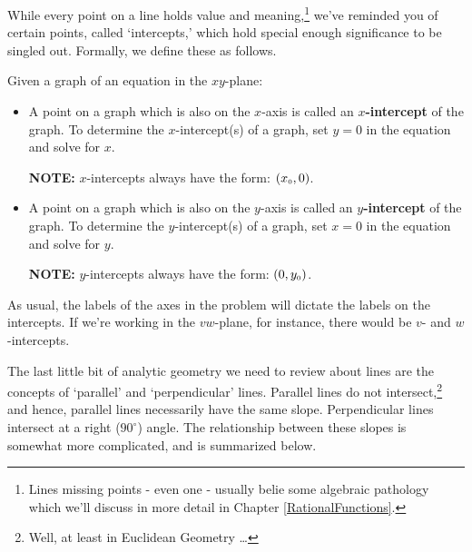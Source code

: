 While every point on a line holds value and meaning,\footnote{Lines missing points  - even one - usually belie some algebraic pathology which we'll discuss in more detail in Chapter \ref{RationalFunctions}.} we've reminded you of certain points, called `intercepts,' which hold special enough significance to be singled out. Formally, we define these as follows.

\medskip

\colorbox{ResultColor}{\bbm


\begin{defn}  Given a graph of an equation in the $xy$-plane:

\label{interceptsdefn}

\begin{itemize}

\item  A point on a graph which is also on the $x$-axis is called an  \textbf{\boldmath $x$-intercept} of the graph.  To determine the $x$-intercept(s) of a graph, set $y = 0$ in the equation and solve for $x$.

\textbf{NOTE:}  $x$-intercepts always have the form:  $(x_{\mbox{\tiny$0$}},0)$.

\item  A point on a graph which is also on the $y$-axis is called an  \textbf{\boldmath $y$-intercept} of the graph. To determine the $y$-intercept(s) of a graph, set $x = 0$ in the equation and solve for $y$.

\textbf{NOTE:}  $y$-intercepts always have the form:  $(0,y_{\mbox{\tiny$0$}})$.

\end{itemize}

\end{defn}

\ebm}

\medskip

As usual, the labels of the axes in the problem will dictate the labels on the intercepts.  If we're working in the $vw$-plane, for instance, there would be $v$- and $w$-intercepts.

\smallskip

The last little bit of analytic geometry we need to review about lines are the concepts of `parallel' and `perpendicular' lines.  Parallel lines do not intersect,\footnote{Well, at least in Euclidean Geometry \dots} and hence, parallel lines necessarily have the same slope.  Perpendicular lines intersect at a right ($90^{\circ}$) angle.   The relationship between these slopes is somewhat more complicated, and is summarized below.

